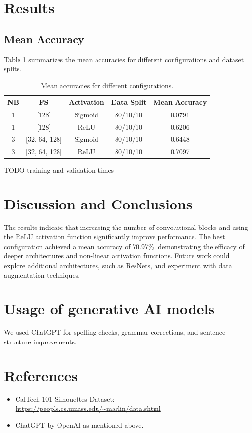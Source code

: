 \documentclass[11pt]{article}
\begin{document}
\section{Results}

\subsection{Mean Accuracy}
Table \ref{tab:results} summarizes the mean accuracies for different configurations and dataset splits.

\begin{table}[H]
    \centering
    \begin{tabular}{|c|c|c|c|c|}
        \hline
        NB & FS & Activation & Data Split & Mean Accuracy \\
        \hline
        1  & [128]          & Sigmoid    & 80/10/10     & 0.0791 \\
        1  & [128]          & ReLU       & 80/10/10     & 0.6206 \\
        3  & [32, 64, 128]  & Sigmoid    & 80/10/10     & 0.6448 \\
        3  & [32, 64, 128]  & ReLU       & 80/10/10     & 0.7097 \\
        \hline
    \end{tabular}
    \caption{Mean accuracies for different configurations.}
    \label{tab:results}
\end{table}

TODO training and validation times

\section{Discussion and Conclusions}
The results indicate that increasing the number of convolutional blocks and using the ReLU activation function significantly improve performance. The best configuration achieved a mean accuracy of 70.97\%, demonstrating the efficacy of deeper architectures and non-linear activation functions. Future work could explore additional architectures, such as ResNets, and experiment with data augmentation techniques.

\section{Usage of generative AI models}

We used ChatGPT for spelling checks, grammar corrections, and sentence structure improvements. 

\section*{References}
\begin{itemize}
    \item CalTech 101 Silhouettes Dataset: \url{https://people.cs.umass.edu/~marlin/data.shtml}
    \item ChatGPT by OpenAI as mentioned above. 
\end{itemize}

\newpage
\printbibliography
\end{document}

